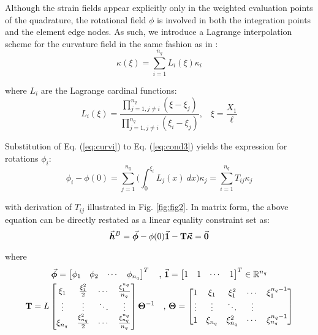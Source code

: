 Although the strain fields appear explicitly
only in the weighted evaluation points of the quadrature, the rotational field
$\phi$ is involved in both the integration points and the element edge nodes.
As such, we introduce a Lagrange interpolation scheme for the curvature
field in the same fashion as in \cite{Andriotis}:
\begin{equation}
	\kappa(\xi) = \sum_{i=1}^{n_q}L_i(\xi)\kappa_i
	\label{eq:curvi}
\end{equation}

\noindent where $L_i$ are the Lagrange cardinal functions:
\begin{equation}
	L_i(\xi) = \frac{\displaystyle\prod_{j=1,j\neq i}^{n_q}
		(\xi-\xi_j)}{\displaystyle\prod_{j=1,j\neq i}^{n_q} 
		(\xi_i-\xi_j)}\text{,}\quad
	\xi=\frac{X_1}{\ell}\nonumber
\end{equation}

\noindent Substitution of Eq. (\ref{eq:curvi}) to Eq. (\ref{eq:cond3}) yields
the expression for rotations $\phi_i$:
\begin{equation}
	\phi_i-\phi(0) = \sum_{j=1}^{n_q}\bigg(\int_0^{\xi_i}L_j(x)\ 
	dx\bigg)\kappa_j =
	\sum_{i=1}^{n_q} T_{ij}\kappa_j
\end{equation}
\begin{figure*}[b]
	\centering
	\qquad
	\caption{Integration of curvature shape functions.}%
	\label{fig:fig2}%
\end{figure*}
\noindent with derivation of $T_{ij}$ illustrated in Fig.  \ref{fig:fig2}.
In matrix form, the above equation can be directly restated as a linear
equality constraint set as:
\begin{equation}
	\vec{\bm{h}}^B=\vec{\bm{\phi}} - \phi(0)\vec{\bm{1}} - \mathbf{T}\vec{\bm{\kappa}} = \vec{\bm{0}}
	\label{eq:hb}
\end{equation}

\noindent where
\begin{gather}
	\vec{\bm{\phi}}=
	\begin{bmatrix}
		\phi_1 & \phi_2 & \cdots & \phi_{n_q}
	\end{bmatrix}^T\quad \text{,}\ \vec{\bm{1}}= \begin{bmatrix}
		1 & 1 & \cdots & 1
	\end{bmatrix}^T\in\mathbb{R}^{n_q} \nonumber\\
	\mathbf{T} = L\begin{bmatrix}
		\xi_1 & \frac{\xi_1^2}{2} & \cdots & 
		\frac{\xi_1^{n_q}}{n_q}\\
		\vdots & \vdots & \ddots & \vdots\\
		\xi_{n_q} & \frac{\xi_{n_q}^2}{2} & \cdots & 
		\frac{\xi_{n_q}^{n_q}}{n_q}
	\end{bmatrix}\mathbf{\Theta}^{-1}\quad \text{,}\ \mathbf{\Theta} = 
	\begin{bmatrix}
		1 & \xi_1 & \xi_1^2 & \cdots & \xi_1^{n_q-1}\\
		\vdots &\vdots & \ddots & \vdots\\
		1 & \xi_{n_q} & \xi_{n_q}^2 & \cdots &\xi_{n_q}^{n_q-1}
	\end{bmatrix}\nonumber
\end{gather}

